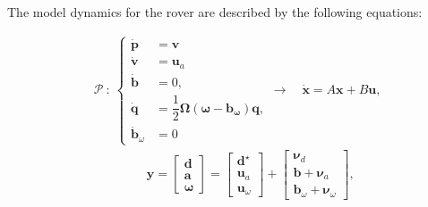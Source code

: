 The model dynamics for the rover are described by the following equations:

\begin{subequations}
	\begin{align}
		 & \mathcal{P} \ : \
		\begin{cases}
			\dot{\bm{p}}          & = \bm{v}                                                   \\
			\dot{\bm{v}}          & = \bm{u}_a                                                 \\
			\dot{\bm{b}}          & = 0,                                                       \\
			\dot{\bm{q}}          & = \dfrac{1}{2}\bm{\Omega(\omega - \bm{b_{\omega}})}\bm{q}, \\
			\dot{\bm{b}}_{\omega} & = 0
		\end{cases}
		\bm{\longrightarrow}
		\quad\dot{\bm{x}} = A\bm{x} + B\bm{u} , \label{probstat:eqn:plant_dyn} \\
		 & \qquad \qquad \ \bm{y} =
		\begin{bmatrix}
			\bm{d} \\
			\bm{a} \\
			\bm{\omega}
		\end{bmatrix}
		=
		\begin{bmatrix}
			\bm{d}^{\star} \\
			\bm{u}_a       \\
			\bm{u}_{\omega}
		\end{bmatrix}
		+
		\begin{bmatrix}
			\bm{\nu}_d          \\
			\bm{b} + \bm{\nu}_a \\
			\bm{b}_{\omega} + \bm{\nu}_{\omega}
		\end{bmatrix},
		\label{probstat:eqn:plant_dyn_output}
	\end{align}
\end{subequations}

